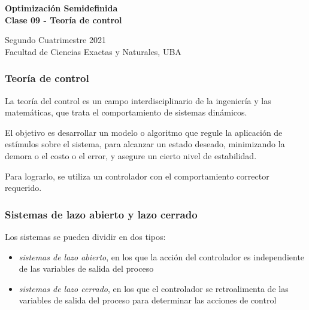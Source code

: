 \documentclass[aspectratio=169,12pt,spanish]{beamer}
\begin{document}

\begin{frame}

 \begin{center}

\Large\textbf{Optimización Semidefinida} \\
\large\textbf{Clase 09 - Teoría de control}




\vspace{1cm}
 Segundo Cuatrimestre 2021
 \\
 {\small Facultad de Ciencias Exactas y Naturales, UBA}
 \end{center}

\end{frame}




\begin{frame}
\frametitle{Teoría de control}

La teoría del control es un campo interdisciplinario de la ingeniería y las matemáticas, que trata el comportamiento de sistemas dinámicos.

El objetivo es desarrollar un modelo o algoritmo que regule la aplicación de estímulos sobre el sistema, para alcanzar un estado deseado, minimizando la demora o el costo o el error, y asegure un cierto nivel de estabilidad.

Para lograrlo, se utiliza un controlador con el comportamiento corrector requerido.

\end{frame}


\begin{frame}
\frametitle{Sistemas de lazo abierto y lazo cerrado}

Los sistemas se pueden dividir en dos tipos:
\begin{itemize}
\item \emph{sistemas de lazo abierto}, en los que la acción del controlador es independiente de las variables de salida del proceso
\item \emph{sistemas de lazo cerrado}, en los que el controlador se retroalimenta de las variables de salida del proceso para determinar las acciones de control
\end{itemize}

\end{frame}
\end{document}
